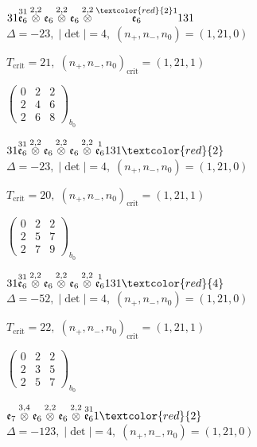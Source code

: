 \documentclass[10pt]{article}
\begin{document}
$31\overset{31}{\mathfrak{e}_6}\overset{2,2}{\otimes}\mathfrak{e}_6\overset{2,2}{\otimes}\mathfrak{e}_6\overset{2,2}{\otimes}\overset{\textcolor{red}{2}1}{\mathfrak{e}_6}131$ \quad $\Delta=-23,\; |\det|=4,\; (n_+,n_-,n_0)=(1,21,0)$

\hspace{1em}$T_{\text{crit}}=21,\; (n_+,n_-,n_0)_{\text{crit}}=(1,21,1)$

\hspace{2em}$\left(\begin{smallmatrix}0 & 2 & 2 \\ 2 & 4 & 6 \\ 2 & 6 & 8\end{smallmatrix}\right)_{\!b_0}$

$31\overset{31}{\mathfrak{e}_6}\overset{2,2}{\otimes}\mathfrak{e}_6\overset{2,2}{\otimes}\mathfrak{e}_6\overset{2,2}{\otimes}\overset{1}{\mathfrak{e}_6}131\textcolor{red}{2}$ \quad $\Delta=-23,\; |\det|=4,\; (n_+,n_-,n_0)=(1,21,0)$

\hspace{1em}$T_{\text{crit}}=20,\; (n_+,n_-,n_0)_{\text{crit}}=(1,21,1)$

\hspace{2em}$\left(\begin{smallmatrix}0 & 2 & 2 \\ 2 & 5 & 7 \\ 2 & 7 & 9\end{smallmatrix}\right)_{\!b_0}$

$31\overset{31}{\mathfrak{e}_6}\overset{2,2}{\otimes}\mathfrak{e}_6\overset{2,2}{\otimes}\mathfrak{e}_6\overset{2,2}{\otimes}\overset{1}{\mathfrak{e}_6}131\textcolor{red}{4}$ \quad $\Delta=-52,\; |\det|=4,\; (n_+,n_-,n_0)=(1,21,0)$

\hspace{1em}$T_{\text{crit}}=22,\; (n_+,n_-,n_0)_{\text{crit}}=(1,21,1)$

\hspace{2em}$\left(\begin{smallmatrix}0 & 2 & 2 \\ 2 & 3 & 5 \\ 2 & 5 & 7\end{smallmatrix}\right)_{\!b_0}$

\smallskip

$\mathfrak{e}_7\overset{3,4}{\otimes}\mathfrak{e}_6\overset{2,2}{\otimes}\mathfrak{e}_6\overset{2,2}{\otimes}\overset{31}{\mathfrak{e}_6}1\textcolor{red}{2}$ \quad $\Delta=-123,\; |\det|=4,\; (n_+,n_-,n_0)=(1,21,0)$
\end{document}
